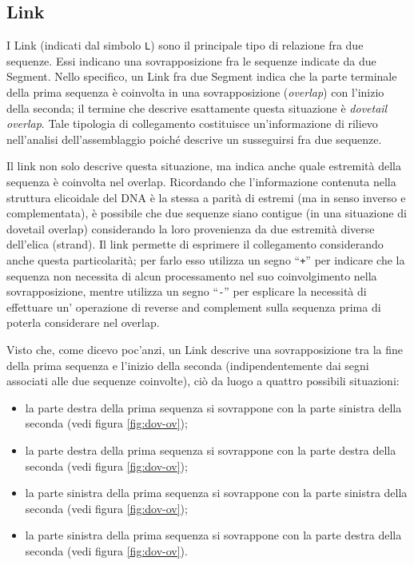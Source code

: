 \subsection{Link}
I Link (indicati dal simbolo \texttt{L}) sono il principale
tipo di relazione fra due sequenze. Essi
indicano una sovrapposizione fra le sequenze indicate da due Segment.
Nello specifico, un Link fra due Segment indica che la parte terminale
della prima sequenza è coinvolta in una sovrapposizione (\emph{overlap})
con l'inizio della seconda; il termine che descrive esattamente questa situazione
è \emph{dovetail overlap}. Tale tipologia di collegamento costituisce
un'informazione di rilievo nell'analisi dell'assemblaggio poiché descrive
un susseguirsi fra due sequenze.

Il link non solo descrive questa situazione, ma indica anche quale
estremità della sequenza è coinvolta nel overlap. Ricordando che
l'informazione contenuta nella struttura elicoidale del DNA è la stessa a parità
di estremi (ma in senso inverso e complementata), è possibile
che due sequenze siano contigue (in una situazione di dovetail
overlap) considerando la loro provenienza da due estremità
diverse dell'elica (strand).
Il link permette di esprimere il collegamento considerando anche questa
particolarità; per farlo esso utilizza un segno ``\texttt{+}'' per indicare
che la sequenza non necessita di alcun processamento nel suo
coinvolgimento nella sovrapposizione, mentre utilizza un segno ``\texttt{-}''
per esplicare la necessità di effettuare un' operazione di reverse
and complement sulla sequenza prima di poterla considerare
nel overlap.

Visto che, come dicevo poc'anzi, un Link descrive una sovrapposizione
tra la fine della prima sequenza e l'inizio della seconda (indipendentemente
dai segni associati alle due sequenze coinvolte), ciò da luogo a quattro
possibili situazioni:
\begin{itemize}
	\item la parte destra della prima sequenza si sovrappone con la parte
		sinistra della seconda (vedi figura \ref{fig:dov-ov});
	\item la parte destra della prima sequenza si sovrappone con la parte
		destra della seconda (vedi figura \ref{fig:dov-ov});
	\item la parte sinistra della prima sequenza si sovrappone con la parte
		sinistra della seconda (vedi figura \ref{fig:dov-ov});
	\item la parte sinistra della prima sequenza si sovrappone con la parte
		destra della seconda (vedi figura \ref{fig:dov-ov}).
\end{itemize}

